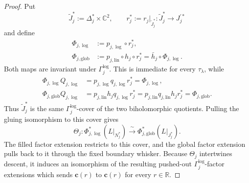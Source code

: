 \begin{proof}
Put
\[
 \widetilde J_j^*:=\Delta_j^*\times\mathbb C^2,
 \qquad
 r_j^*:=r_j|_{\widetilde J_j^*}:
 \widetilde J_j^*\longrightarrow J_j^{\prime *}
\]
and define
\[
\begin{aligned}
 \Phi_{j,\log}
  &:=p_{j,\log}\circ r_j^*,\\
 \Phi_{j,\mathrm{glob}}
  &:=p_{j,\mathrm{lin}}\circ h_j\circ r_j^*
   =\bar h_j\circ\Phi_{j,\log}.
\end{aligned}
\]
Both maps are invariant under \(\Gamma_j^{\log}\).  This is immediate for
every \(\tau_\lambda\), while
\[
\begin{aligned}
 \Phi_{j,\log}Q_{j,\log}
 &=p_{j,\log}q_{j,\log}r_j^*
  =\Phi_{j,\log},\\
 \Phi_{j,\mathrm{glob}}Q_{j,\log}
 &=p_{j,\mathrm{lin}}h_jq_{j,\log}r_j^*
  =p_{j,\mathrm{lin}}q_{j,\mathrm{lin}}h_jr_j^*
  =\Phi_{j,\mathrm{glob}}.
\end{aligned}
\]
Thus \(\widetilde J_j^*\) is the same \(\Gamma_j^{\log}\)-cover of the two
biholomorphic quotients.  Pulling the gluing isomorphism to this cover gives
\[
 \Theta_j:
 \Phi_{j,\log}^*(L|_{N_j^*})
 \xrightarrow{\ \sim\ }
 \Phi_{j,\mathrm{glob}}^*(L|_{J_j^*}).
\]
The filled factor extension restricts to this cover, and the global factor
extension pulls back to it through the fixed boundary whisker.  Because
\(\Theta_j\) intertwines descent, it induces an isomorphism of the resulting
pushed-out \(\Gamma_j^{\log}\)-factor extensions which sends
\(\mathbf c(r)\) to \(\mathbf c(r)\) for every \(r\in\mathbb R\).


\end{proof}
